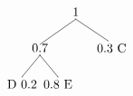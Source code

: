 \documentclass[10pt,a4paper,spanish]{report}
\begin{document}
      \begin{minipage}{0.5\textwidth}
      \[\begin{xy}
      ,(0,0)*+=<10mm>[]\txt<2cm>{1}
      ,(-10,-10)*+=<10mm>[]\txt<2cm>{0.7}
      ,(10,-10)*+=<10mm>[]\txt<2cm>{0.3 C}
      ,(-15,-20)*+=<10mm>[]\txt<2cm>{D 0.2}
      ,(-5,-20)*+=<10mm>[]\txt<2cm>{0.8 E}

      \ar@{-} (0,-2);(-10,-9) %
      \ar@{-} (0,-2);(9,-8) %
      \ar@{-} (-10,-12);(-15,-18) %
      \ar@{-} (-10,-12);(-5,-18)
      \end{xy}\]
      \end{minipage}
\end{document}
